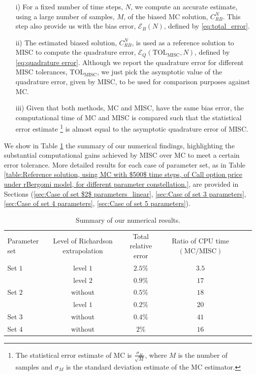 \begin{enumerate}
\item[i)] For a fixed number of time steps, $N$, we compute an accurate estimate, using a large number of samples, $M$, of the biased  MC solution, $C_{RB}^{N}$. This step also provide us with the bias error, $\mathcal{E}_B(N)$, defined by \eqref{eq:total_error}. 
\item[ii)] The estimated  biased solution,  $C_{RB}^{N}$, is used as a reference solution  to MISC to compute the quadrature error, $\mathcal{E}_Q(\text{TOL}_{\text{MISC}},N)$, defined by \eqref{eq:quadrature error}. Although we report the quadrature error for different MISC tolerances, $\text{TOL}_{\text{MISC}}$, we just pick the asymptotic value of the quadrature error, given by MISC, to be used for comparison purposes against MC.

\item[iii)]  Given that both methods, MC and MISC, have the same bias error,  the computational time of MC and MISC is compared such that the statistical error estimate \footnote{The statistical error estimate of MC is  $\frac{\sigma_M}{\sqrt{M}}$, where $M$ is the number of samples and $\sigma_M$ is the standard deviation estimate of the MC estimator.} is almost equal to the asymptotic quadrature error of MISC. 
\end{enumerate}

We show in Table \ref{table:Summary of our numerical results.} the summary of our numerical findings, highlighting the substantial computational gains achieved by MISC over MC to meet a certain error tolerance. More detailed results for each case of parameter set, as in Table \ref{table:Reference solution, using MC with $500$ time steps, of Call option price under rBergomi model, for different parameter constellation.},  are provided in  Sections (\ref{sec:Case of set $2$ parameters_linear}, \ref{sec:Case of set 3 parameters}, \ref{sec:Case of set 4 parameters}, \ref{sec:Case of set 5 parameters}). 



\FloatBarrier
\begin{table}[!h]
	\centering
	\begin{small}
	\begin{tabular}{l*{4}{c}r}
		Parameter set           & Level of Richardson extrapolation    &  Total relative error  & Ratio of CPU time  $\left(\text{MC}/ \text{MISC} \right)$ \\
			Set $1$ & level $1$ &  $2.5\%$&  $3.5$ \\	
              & level $2$ &  $0.9\%$ &  $17$ \\	
              \hline
            Set $2$  & without    &  $0.5\%$&  $18$ \\	
				 & level $1$ &  $0.2\%$&  $20$ \\	
				 \hline
					Set $3$  & without    &  $0.4\%$&  $41$ \\	
					\hline
						Set $4$ & without  &  $2\%$&  $16$ \\	
		\hline
	\end{tabular}
\end{small}
	\caption{Summary of our numerical results.}
	\label{table:Summary of our numerical results.}
\end{table}


